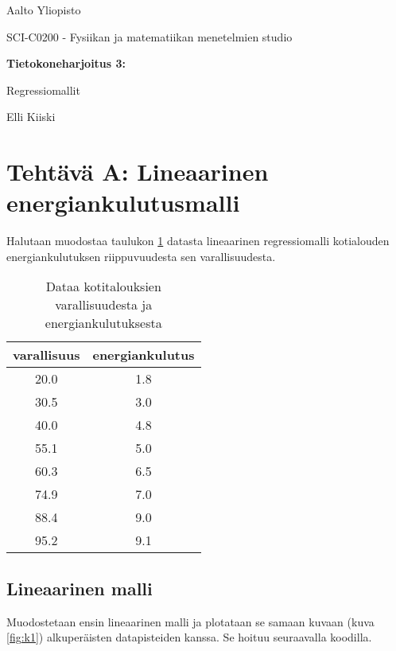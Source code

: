 \documentclass[a4paper,11pt]{article}
\begin{document}
{
\thispagestyle{empty}

{\large
Aalto Yliopisto
\par
SCI-C0200 - Fysiikan ja matematiikan menetelmien studio
}

\vspace{7cm}

{\huge \bf
Tietokoneharjoitus 3: 
\par
Regressiomallit}

\vspace{2cm}

{\Large Elli Kiiski}

\clearpage

\tableofcontents

\clearpage

\section{Tehtävä A: Lineaarinen energiankulutusmalli}

Halutaan muodostaa taulukon \ref{table:t} datasta lineaarinen regressiomalli kotialouden energiankulutuksen riippuvuudesta sen varallisuudesta.

\begin{table}[!htb]
    \centering
    \begin{tabular}{|c|c|}
    \hline
    varallisuus & energiankulutus \\
    \hline
    20.0 & 1.8 \\
    30.5 & 3.0 \\
    40.0 & 4.8 \\
    55.1 & 5.0 \\
    60.3 & 6.5 \\
    74.9 & 7.0 \\
    88.4 & 9.0 \\
    95.2 & 9.1 \\
    \hline
    \end{tabular}
    \caption{Dataa kotitalouksien varallisuudesta ja energiankulutuksesta}
    \label{table:t}
\end{table}

\subsection{Lineaarinen malli}

Muodostetaan ensin lineaarinen malli ja plotataan se samaan kuvaan (kuva \ref{fig:k1}) alkuperäisten datapisteiden kanssa. Se hoituu seuraavalla koodilla.

}
\end{document}
